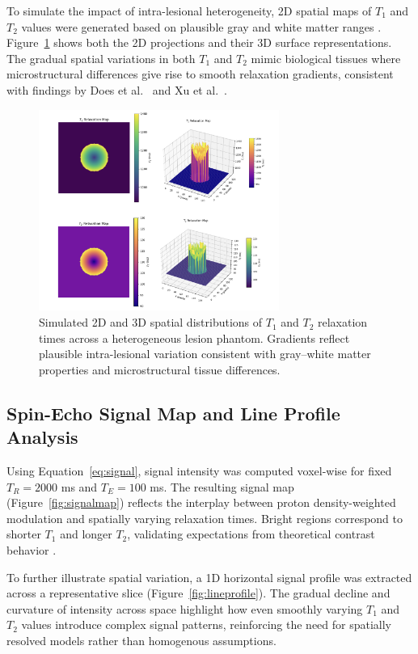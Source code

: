 \documentclass[10pt,a4paper,twoside]{article}
\begin{document}
To simulate the impact of intra-lesional heterogeneity, 2D spatial maps of $ T_1 $ and $ T_2 $ values were generated based on plausible gray and white matter ranges \cite{stanisz2005, bojorquez2017}. Figure~\ref{fig:t1t2maps} shows both the 2D projections and their 3D surface representations. The gradual spatial variations in both $ T_1 $ and $ T_2 $ mimic biological tissues where microstructural differences give rise to smooth relaxation gradients, consistent with findings by Does et al.\ \cite{does2002} and Xu et al.\ \cite{xu2009}.

\begin{figure}[htbp!]
\centering
\includegraphics[width=0.7\textwidth]{t1t2maps.png}
\caption{Simulated 2D and 3D spatial distributions of $T_1$ and $T_2$ relaxation times across a heterogeneous lesion phantom. Gradients reflect plausible intra-lesional variation consistent with gray–white matter properties and microstructural tissue differences.}
\label{fig:t1t2maps}
\end{figure}


\subsection{Spin-Echo Signal Map and Line Profile Analysis}

Using Equation~\eqref{eq:signal}, signal intensity was computed voxel-wise for fixed $ T_R = 2000 $ ms and $ T_E = 100 $ ms. The resulting signal map (Figure~\ref{fig:signalmap}) reflects the interplay between proton density-weighted modulation and spatially varying relaxation times. Bright regions correspond to shorter $ T_1 $ and longer $ T_2 $, validating expectations from theoretical contrast behavior \cite{bernstein2004, brown2014}.

To further illustrate spatial variation, a 1D horizontal signal profile was extracted across a representative slice (Figure~\ref{fig:lineprofile}). The gradual decline and curvature of intensity across space highlight how even smoothly varying $ T_1 $ and $ T_2 $ values introduce complex signal patterns, reinforcing the need for spatially resolved models rather than homogenous assumptions.
\end{document}
